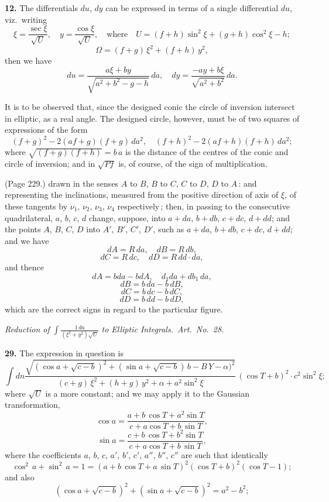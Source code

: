 \documentclass[11pt,a4paper]{article}
\theoremstyle{plain}
\theoremstyle{definition}
\begin{document}
\medskip

\noindent\textbf{12.} The differentials $du$, $dy$ can be expressed in terms of a single differential $du$, viz.\ writing
\[
\xi = \frac{\sec\xi}{\sqrt{U}}, \quad y = \frac{\cos\xi}{\sqrt{U}}, \quad \text{where} \quad U = (f + h)\sin^2 \xi + (g + h)\cos^2\xi - h;
\]
\[
\Omega = (f + g)\,\xi^2 + (f + h)\,y^2,
\]
then we have
\[
du = \frac{a\xi + b y}{\sqrt{a^2 + b^2 - g - h}}\,d a, \quad dy = \frac{- a y + b \xi}{\sqrt{a^2 + b^2}}\,d a.
\]

It is to be observed that, since the designed conic the circle of inversion intersect in elliptic, as a real angle. The designed circle, however, must be of two squares of expressions of the form
\[
(f + g)^2 - 2(a f + g)(f + g)\,da^2, \quad (f + h)^2 - 2(a f + h)(f + h)\,da^2;
\]
where $\sqrt{(f + g)(f + h)} = b\,a$ is the distance of the centres of the conic and circle of inversion; and in $\sqrt{P f}$ is, of course, of the sign of multiplication.

\medskip

\noindent (Page 229.) drawn in the senses $A$ to $B$, $B$ to $C$, $C$ to $D$, $D$ to $A$\,: and representing the inclinations, measured from the positive direction of axis of $\xi$, of these tangents by $\nu_1$, $\nu_2$, $\nu_3$, $\nu_4$ respectively\,; then, in passing to the consecutive quadrilateral, $a$, $b$, $c$, $d$ change, suppose, into $a + da$, $b + db$, $c + dc$, $d + dd$; and the points $A$, $B$, $C$, $D$ into $A'$, $B'$, $C'$, $D'$, such as $a + da$, $b + db$, $c + dc$, $d + dd$; and we have
\[
d A = R\,da, \quad dB = R\,db,
\]
\[
d C = R\,dc, \quad dD = R\,dd \cdot da,
\]
and thence
\[
dA = b da - b dA, \quad d_1 d a + db_1\,d a,
\]
\[
dB = b\,da - b\,d B,
\]
\[
dC = b\,dc - b\,d C,
\]
\[
dD = b\,dd - b\,d D,
\]
which are the correct signs in regard to the particular figure.

\bigskip

\noindent\textit{Reduction of} $\int \frac{1\,d a}{(\xi^2 + y^2)\sqrt{U}}$ \textit{to Elliptic Integrals.\ Art.\ No.\ 28.}

\medskip

\noindent\textbf{29.} The expression in question is
\[
\int dn \frac{\sqrt{(\cos a + \sqrt{c - b})^2 + (\sin a + \sqrt{c - b})\,b - B\,Y - \alpha)^2}}{(c + g)\,\xi^2 + (h + g)\,y^2 + \alpha + a^2 \sin^2 \xi}\,(\cos T + b)^2 \cdot c^2 \sin^2 \xi;
\]
where $\sqrt{U}$ is a more constant; and we may apply it to the Gaussian transformation,
\[
\cos a = \frac{a + b\,\cos T + a^2 \sin T}{c + a\cos T + b\,\sin T},
\]
\[
\sin a = \frac{c + b\,\cos T + b^2 \sin T}{c + a \cos T + b\,\sin T},
\]
where the coefficients $a$, $b$, $c$, $a'$, $b'$, $c'$, $a''$, $b''$, $c''$ are such that identically
\[
\cos^2\,a + \sin^2\,a = 1 = (a + b\,\cos T + a\,\sin T)^2(\cos T + b)^2(\cos T - 1);
\]
and also
\[
(\cos a + \sqrt{c - b})^2 + (\sin a + \sqrt{c - b})^2 = a^2 - b^2;
\]
\end{document}
